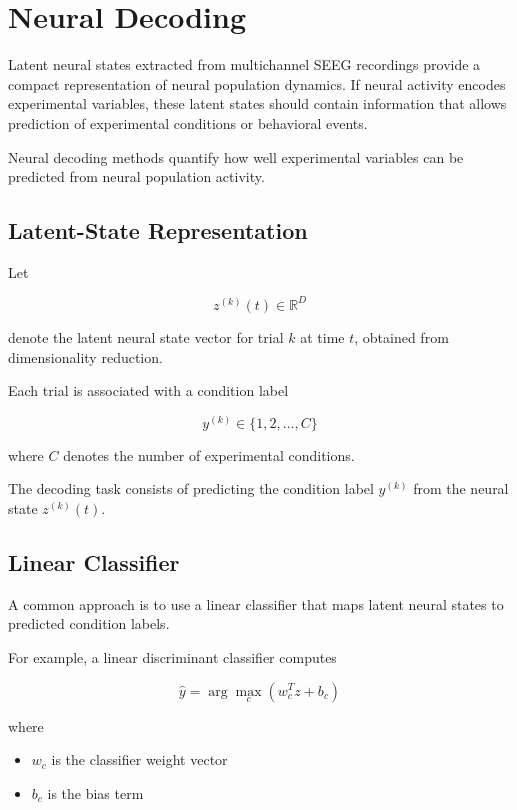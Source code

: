 \documentclass[11pt]{report}
\begin{document}
\chapter{Neural Decoding}

Latent neural states extracted from multichannel SEEG recordings
provide a compact representation of neural population dynamics.
If neural activity encodes experimental variables, these latent
states should contain information that allows prediction of
experimental conditions or behavioral events.

Neural decoding methods quantify how well experimental variables
can be predicted from neural population activity.

\section{Latent-State Representation}

Let

\begin{equation}
z^{(k)}(t) \in \mathbb{R}^{D}
\end{equation}

denote the latent neural state vector for trial $k$ at time $t$,
obtained from dimensionality reduction.

Each trial is associated with a condition label

\begin{equation}
y^{(k)} \in \{1,2,\dots,C\}
\end{equation}

where $C$ denotes the number of experimental conditions.

The decoding task consists of predicting the condition label
$y^{(k)}$ from the neural state $z^{(k)}(t)$.

\section{Linear Classifier}

A common approach is to use a linear classifier that maps latent
neural states to predicted condition labels.

For example, a linear discriminant classifier computes

\begin{equation}
\hat{y} =
\arg\max_c
\left(
w_c^T z + b_c
\right)
\end{equation}

where

\begin{itemize}
\item $w_c$ is the classifier weight vector
\item $b_c$ is the bias term
\end{itemize}
\end{document}

